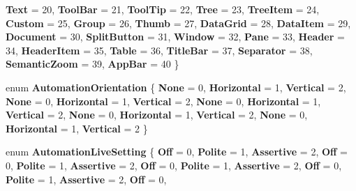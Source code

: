 \begin{DoxyCompactItemize}
\newline
{\bfseries Text} = 20, 
{\bfseries Tool\+Bar} = 21, 
{\bfseries Tool\+Tip} = 22, 
{\bfseries Tree} = 23, 
\newline
{\bfseries Tree\+Item} = 24, 
{\bfseries Custom} = 25, 
{\bfseries Group} = 26, 
{\bfseries Thumb} = 27, 
\newline
{\bfseries Data\+Grid} = 28, 
{\bfseries Data\+Item} = 29, 
{\bfseries Document} = 30, 
{\bfseries Split\+Button} = 31, 
\newline
{\bfseries Window} = 32, 
{\bfseries Pane} = 33, 
{\bfseries Header} = 34, 
{\bfseries Header\+Item} = 35, 
\newline
{\bfseries Table} = 36, 
{\bfseries Title\+Bar} = 37, 
{\bfseries Separator} = 38, 
{\bfseries Semantic\+Zoom} = 39, 
\newline
{\bfseries App\+Bar} = 40
 \}
\item 
\mbox{\label{namespace_windows_1_1_u_i_1_1_xaml_1_1_automation_1_1_peers_a7279523ced8212af46486c324a89ee2b}} 
enum {\bfseries Automation\+Orientation} \{ \newline
{\bfseries None} = 0, 
{\bfseries Horizontal} = 1, 
{\bfseries Vertical} = 2, 
{\bfseries None} = 0, 
\newline
{\bfseries Horizontal} = 1, 
{\bfseries Vertical} = 2, 
{\bfseries None} = 0, 
{\bfseries Horizontal} = 1, 
\newline
{\bfseries Vertical} = 2, 
{\bfseries None} = 0, 
{\bfseries Horizontal} = 1, 
{\bfseries Vertical} = 2, 
\newline
{\bfseries None} = 0, 
{\bfseries Horizontal} = 1, 
{\bfseries Vertical} = 2
 \}
\item 
\mbox{\label{namespace_windows_1_1_u_i_1_1_xaml_1_1_automation_1_1_peers_a3a01b3ce21eb110af096e897e16e1c78}} 
enum {\bfseries Automation\+Live\+Setting} \{ \newline
{\bfseries Off} = 0, 
{\bfseries Polite} = 1, 
{\bfseries Assertive} = 2, 
{\bfseries Off} = 0, 
\newline
{\bfseries Polite} = 1, 
{\bfseries Assertive} = 2, 
{\bfseries Off} = 0, 
{\bfseries Polite} = 1, 
\newline
{\bfseries Assertive} = 2, 
{\bfseries Off} = 0, 
{\bfseries Polite} = 1, 
{\bfseries Assertive} = 2, 
\newline
{\bfseries Off} = 0, 

\end{DoxyCompactItemize}
